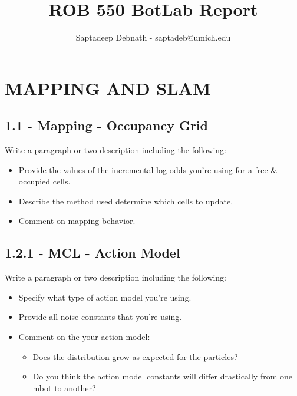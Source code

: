 \documentclass[journal,twocolumn]{IEEEtran}
\begin{document}
\title{%
  ROB 550 BotLab Report \\
  }
    
\author{Saptadeep Debnath - saptadeb@umich.edu}

\maketitle

\IEEEpeerreviewmaketitle

\section{MAPPING AND SLAM}

\subsection*{1.1 - Mapping - Occupancy Grid} 

Write a paragraph or two description including the following:

\begin{itemize}
    \item Provide the values of the incremental log odds you're using for a free \& occupied cells.
    \item Describe the method used determine which cells to update.
    \item Comment on mapping behavior.
\end{itemize}

\subsection*{1.2.1 - MCL - Action Model} 

 Write a paragraph or two description including the following:
 \begin{itemize}
    \item Specify what type of action model you're using.
    \item Provide all noise constants that you're using.
    \item Comment on the your action model:
        \begin{itemize}
            \item Does the distribution grow as expected for the particles?
            \item Do you think the action model constants will differ drastically from one
mbot to another?
        \end{itemize}
\end{itemize}
\end{document}
